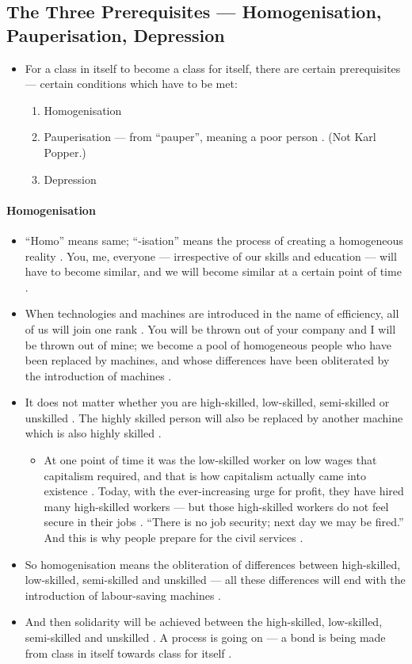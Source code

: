 \subsection{The Three Prerequisites --- Homogenisation, Pauperisation, Depression}
\begin{itemize}
    \item For a class in itself to become a class for itself, there are certain prerequisites --- certain conditions which have to be met: 
    \begin{enumerate}
        \item Homogenisation 
        \item Pauperisation --- from ``pauper'', meaning a poor person . (Not Karl Popper.) 
        \item Depression 
    \end{enumerate}
\end{itemize}

\paragraph{Homogenisation}
\begin{itemize}
    \item ``Homo'' means same; ``-isation'' means the process of creating a homogeneous reality . You, me, everyone --- irrespective of our skills and education --- will have to become similar, and we will become similar at a certain point of time .
    \item When technologies and machines are introduced in the name of efficiency, all of us will join one rank . You will be thrown out of your company and I will be thrown out of mine; we become a pool of homogeneous people who have been replaced by machines, and whose differences have been obliterated by the introduction of machines .
    \item It does not matter whether you are high-skilled, low-skilled, semi-skilled or unskilled . The highly skilled person will also be replaced by another machine which is also highly skilled .
    \begin{itemize}
        \item At one point of time it was the low-skilled worker on low wages that capitalism required, and that is how capitalism actually came into existence . Today, with the ever-increasing urge for profit, they have hired many high-skilled workers --- but those high-skilled workers do not feel secure in their jobs . ``There is no job security; next day we may be fired.''  And this is why people prepare for the civil services .
    \end{itemize}
    \item So homogenisation means the obliteration of differences between high-skilled, low-skilled, semi-skilled and unskilled --- all these differences will end with the introduction of labour-saving machines .
    \item And then solidarity will be achieved between the high-skilled, low-skilled, semi-skilled and unskilled . A process is going on --- a bond is being made from class in itself towards class for itself .
\end{itemize}

